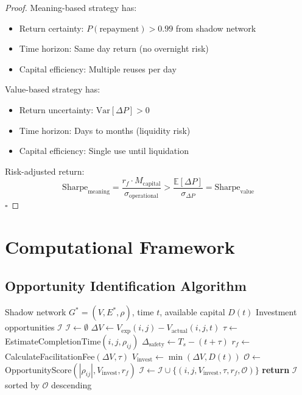 \documentclass[12pt]{article}
\begin{document}
\begin{proof}
Meaning-based strategy has:
\begin{itemize}
    \item Return certainty: $P(\text{repayment}) > 0.99$ from shadow network
    \item Time horizon: Same day return (no overnight risk)
    \item Capital efficiency: Multiple reuses per day
\end{itemize}

Value-based strategy has:
\begin{itemize}
    \item Return uncertainty: $\text{Var}[\Delta P] > 0$
    \item Time horizon: Days to months (liquidity risk)
    \item Capital efficiency: Single use until liquidation
\end{itemize}

Risk-adjusted return:
$$
\text{Sharpe}_{\text{meaning}} = \frac{r_f \cdot M_{\text{capital}}}{\sigma_{\text{operational}}} > \frac{\mathbb{E}[\Delta P]}{\sigma_{\Delta P}} = \text{Sharpe}_{\text{value}}
$$
$\square$
\end{proof}

\section{Computational Framework}

\subsection{Opportunity Identification Algorithm}

\begin{algorithm}
\caption{Temporal Arbitrage Opportunity Identification}
\begin{algorithmic}[1]
\REQUIRE Shadow network $G^* = (V, E^*, \rho)$, time $t$, available capital $D(t)$
\ENSURE Investment opportunities $\mathcal{I}$
\STATE $\mathcal{I} \leftarrow \emptyset$
    \STATE $\Delta V \leftarrow V_{\text{exp}}(i,j) - V_{\text{actual}}(i,j,t)$
        \STATE $\tau \leftarrow$ EstimateCompletionTime$(i,j,\rho_{ij})$
        \STATE $\Delta_{\text{safety}} \leftarrow T_s - (t + \tau)$
            \STATE $r_f \leftarrow$ CalculateFacilitationFee$(\Delta V, \tau)$
            \STATE $V_{\text{invest}} \leftarrow \min(\Delta V, D(t))$
            \STATE $\mathcal{O} \leftarrow$ OpportunityScore$(|\rho_{ij}|, V_{\text{invest}}, r_f)$
            \STATE $\mathcal{I} \leftarrow \mathcal{I} \cup \{(i,j,V_{\text{invest}},\tau,r_f,\mathcal{O})\}$
        \ENDIF
    \ENDIF
\ENDFOR
\STATE \textbf{return} $\mathcal{I}$ sorted by $\mathcal{O}$ descending
\end{algorithmic}
\end{algorithm}
\end{document}
